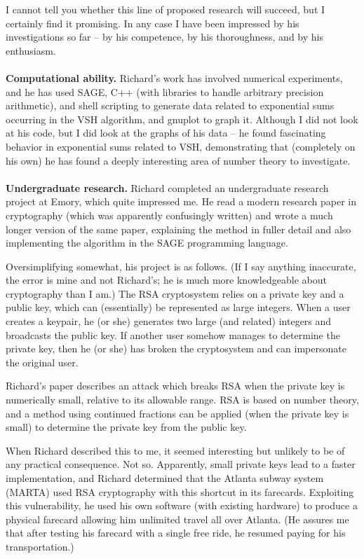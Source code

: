 \documentclass[11pt]{article}
\begin{document}
I cannot tell you whether this line of proposed research will succeed, but I certainly find it promising.
In any case I have been impressed by his investigations
so far -- by his competence, by his thoroughness, and by his enthusiasm. 
\\
\\
{\bf Computational ability.} Richard's work has involved numerical experiments, and he has used
SAGE, C++ (with libraries to handle arbitrary precision arithmetic), and shell scripting to generate data related
to exponential sums occurring in the VSH algorithm, 
and gnuplot to graph it. Although I did not look at his code, 
but I did look at the graphs of his data -- he found fascinating behavior in exponential sums related to VSH,
demonstrating that (completely on his own) he has found a deeply interesting area of number theory to investigate.
\\
\\
{\bf Undergraduate research.} Richard completed an undergraduate research project at Emory, which quite impressed me. He read a
modern research paper in cryptography (which was apparently confusingly written) and wrote a much longer
version
of the same paper, explaining the method in fuller detail and also implementing the algorithm in the
SAGE programming language.

Oversimplifying somewhat, his project is as follows. (If I say anything inaccurate, the error is mine
and not Richard's; he is much
more knowledgeable about cryptography than I am.) The RSA cryptosystem relies on a private key and a
public key, which
can (essentially) be represented as large integers. When a user creates a keypair, he (or she) generates
two large (and related) integers and
broadcasts the public key. If another user somehow manages to determine the private key, then he (or
she) has broken the cryptosystem
and can impersonate the original user. 

Richard's paper describes an attack which breaks RSA when the private key is numerically small, relative
to its allowable range.
RSA is based on number theory, and a method using continued fractions can be applied (when the private
key is small) to determine the private
key from the public key.

When Richard described this to me, it seemed interesting but unlikely to be of any practical
consequence. Not so. Apparently,
small private keys lead to a faster implementation, and Richard
determined that the Atlanta subway system (MARTA) used RSA cryptography with this shortcut in its
farecards.
Exploiting this vulnerability, he used his own software (with existing hardware) to produce a physical
farecard allowing him unlimited travel all over Atlanta. 
(He assures me
that after testing his farecard with a single free ride, he resumed paying for his transportation.)
\end{document}
